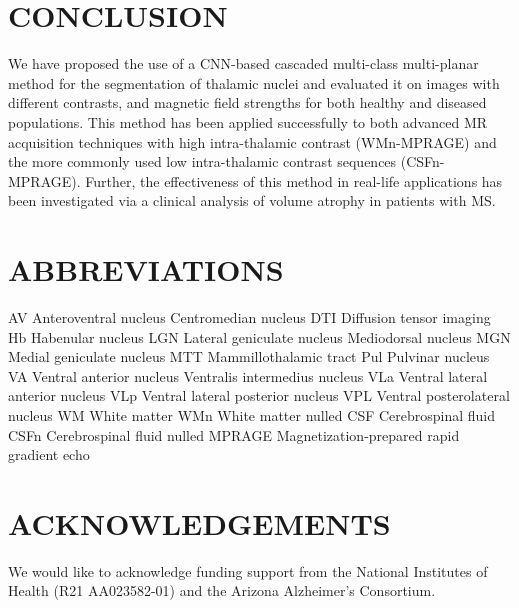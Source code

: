 \section{CONCLUSION}
We have proposed the use of a CNN-based cascaded multi-class multi-planar method for the segmentation of thalamic nuclei and evaluated it on images with different contrasts, and magnetic field strengths for both healthy and diseased populations. This method has been applied successfully to both advanced MR acquisition techniques with high intra-thalamic contrast (WMn-MPRAGE) and the more commonly used low intra-thalamic contrast sequences (CSFn-MPRAGE). Further, the effectiveness of this method in real-life applications has been investigated via a clinical analysis of volume atrophy in patients with MS\@.

\section{ABBREVIATIONS}
AV Anteroventral nucleus
Centromedian nucleus
DTI Diffusion tensor imaging
Hb Habenular nucleus
LGN Lateral geniculate nucleus
Mediodorsal nucleus
MGN Medial geniculate nucleus
MTT Mammillothalamic tract
Pul Pulvinar nucleus
VA Ventral anterior nucleus
Ventralis intermedius nucleus
VLa Ventral lateral anterior nucleus
VLp Ventral lateral posterior nucleus
VPL Ventral posterolateral nucleus
WM White matter
WMn White matter nulled
CSF Cerebrospinal fluid
CSFn Cerebrospinal fluid nulled
MPRAGE Magnetization-prepared rapid gradient echo

\section{ACKNOWLEDGEMENTS}
We would like to acknowledge funding support from the National Institutes of Health (R21 AA023582-01) and the Arizona Alzheimer's Consortium.

